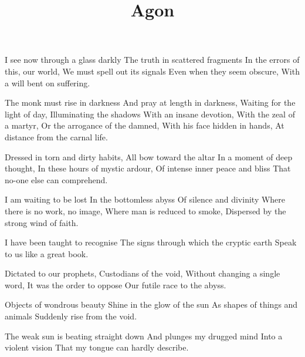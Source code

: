 \documentclass{article}
\title{Agon}
\newenvironment{stanza}{\begin{minipage}{10cm}\obeylines}{\end{minipage}\vspace{\baselineskip}}
\begin{document}
\maketitle

\clearpage


\begin{stanza}
I see now through a glass darkly
The truth in scattered fragments
In the errors of this, our world,
We must spell out its signals
Even when they seem obscure,
With a will bent on suffering.
\end{stanza}

\begin{stanza}
The monk must rise in darkness
And pray at length in darkness,
Waiting for the light of day,
Illuminating the shadows
With an insane devotion,
With the zeal of a martyr,
Or the arrogance of the damned,
With his face hidden in hands,
At distance from the carnal life.
\end{stanza}

\begin{stanza}
Dressed in torn and dirty habits,
All bow toward the altar
In a moment of deep thought,
In these hours of mystic ardour,
Of intense inner peace and bliss
That no-one else can comprehend.
\end{stanza}

\begin{stanza}
I am waiting to be lost
In the bottomless abyss
Of silence and divinity
Where there is no work, no image,
Where man is reduced to smoke,
Dispersed by the strong wind of faith.
\end{stanza}

\begin{stanza}
I have been taught to recognise
The signs through which the cryptic earth
Speak to us like a great book.
\end{stanza}

\begin{stanza}
Dictated to our prophets,
Custodians of the void,
Without changing a single word,
It was the order to oppose
Our futile race to the abyss.
\end{stanza}

\begin{stanza}
Objects of wondrous beauty
Shine in the glow of the sun
As shapes of things and animals
Suddenly rise from the void.
\end{stanza}

\begin{stanza}
The weak sun is beating straight down
And plunges my drugged mind
Into a violent vision
That my tongue can hardly describe.
\end{stanza}
\end{document}
